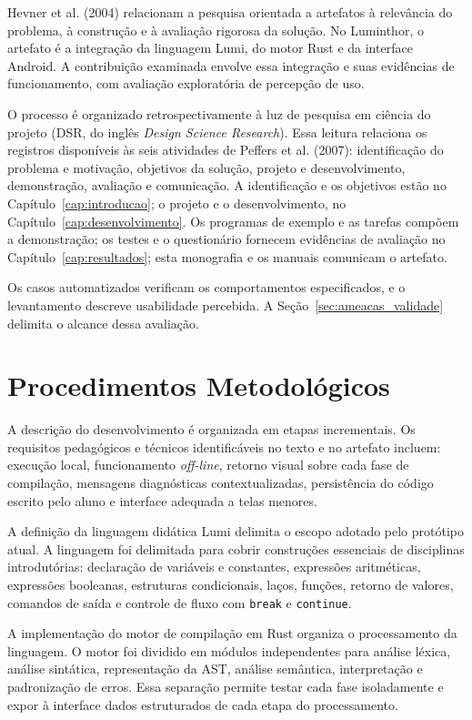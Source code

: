 \documentclass[
    12pt
    ,oneside
    ,a4paper
    ,chapter=TITLE
    ,section=TITLE
    ,sumario=abnt-6027-2012]{abntex2}
\begin{document}
Hevner et al. (2004) relacionam a pesquisa orientada a artefatos à relevância do
problema, à construção e à avaliação rigorosa da solução. No Luminthor, o artefato
é a integração da linguagem Lumi, do motor Rust e da interface Android. A
contribuição examinada envolve essa integração e suas evidências de funcionamento,
com avaliação exploratória de percepção de uso.

O processo é organizado retrospectivamente à luz de pesquisa em ciência do projeto (DSR, do inglês \textit{Design Science Research}). Essa leitura relaciona os registros disponíveis às seis atividades de
Peffers et al. (2007): identificação do problema e motivação, objetivos da solução,
projeto e desenvolvimento, demonstração, avaliação e comunicação. A identificação
e os objetivos estão no Capítulo~\ref{cap:introducao}; o projeto e o desenvolvimento,
no Capítulo~\ref{cap:desenvolvimento}. Os programas de exemplo e as tarefas compõem
a demonstração; os testes e o questionário fornecem evidências de avaliação no
Capítulo~\ref{cap:resultados}; esta monografia e os manuais comunicam o artefato.

Os casos
automatizados verificam os comportamentos especificados, e o levantamento descreve
usabilidade percebida. A Seção~\ref{sec:ameacas_validade} delimita o alcance dessa avaliação.

\section{Procedimentos Metodológicos}

A descrição do desenvolvimento é organizada em etapas incrementais. Os requisitos
pedagógicos e técnicos identificáveis no texto e no artefato incluem: execução local, funcionamento
\textit{off-line}, retorno visual sobre cada fase de compilação, mensagens diagnósticas
contextualizadas, persistência do código escrito pelo aluno e interface adequada a telas menores.

A definição da linguagem didática Lumi delimita o escopo adotado pelo protótipo atual. A
linguagem foi delimitada para cobrir construções essenciais de disciplinas introdutórias:
declaração de variáveis e constantes, expressões aritméticas, expressões booleanas, estruturas
condicionais, laços, funções, retorno de valores, comandos de saída e controle de fluxo com
\texttt{break} e \texttt{continue}.

A implementação do motor de compilação em Rust organiza o processamento da linguagem. O motor foi
dividido em módulos independentes para análise léxica, análise sintática, representação da AST,
análise semântica, interpretação e padronização de erros. Essa separação permite testar cada
fase isoladamente e expor à interface dados estruturados de cada etapa do processamento.
\end{document}
